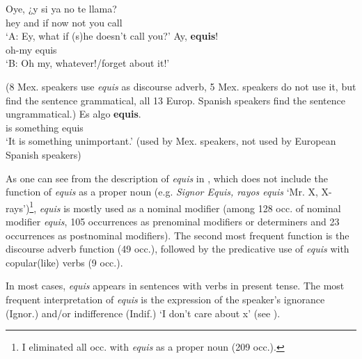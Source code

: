 \documentclass[output=paper]{langsci/langscibook}
\begin{document}
\ea\label{ex:kellert:7}
\begin{xlist}
\gll Oye, {¿}y si ya no te llama?\\
hey and if now not you call\\
\glt ‘A: Ey, what if (s)he doesn’t call you?'
Ay, \textbf{equis}!\\
oh-my equis\\
\glt ‘B: Oh my, whatever!\slash forget about it!’\\
\end{xlist}
(8 Mex. speakers use \textit{equis} as discourse adverb, 5 Mex. speakers do not use it, but find the sentence grammatical, all 13 Europ. Spanish speakers find the sentence ungrammatical.)
\ex \label{ex:kellert:8}
\gll Es algo \textbf{equis}.\\
is something equis\\
\glt ‘It is something unimportant.’
(used by Mex. speakers, not used by European Spanish speakers)
\z

As one can see from the description of \textit{equis} in , which does not include the function of \textit{equis} as a proper noun (e.g. \textit{Signor Equis, rayos equis} ‘Mr. X, X-rays’)\footnote{I eliminated all occ. with \textit{equis} as a proper noun (209 occ.).}, \textit{equis} is mostly used as a nominal modifier (among 128 occ. of nominal modifier \textit{equis}, 105 occurrences as prenominal modifiers or determiners and 23 occurrences as postnominal modifiers). The second most frequent function is the discourse adverb function (49 occ.), followed by the predicative use of \textit{equis} with copular(like) verbs (9 occ.).

In most cases, \textit{equis} appears in sentences with verbs in present tense. The most frequent interpretation of \textit{equis} is the expression of the speaker’s ignorance (Ignor.) and/or indifference (Indif.) ‘I don’t care about x’ (see ).
\end{document}
